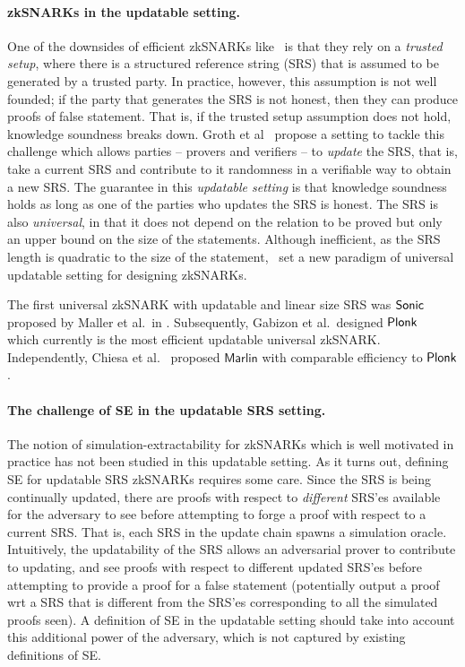 \paragraph{zkSNARKs in the updatable setting.}
One of the downsides of efficient zkSNARKs like~\cite{AC:Groth10a,TCC:Lipmaa12,EC:GGPR13,SP:PHGR13,AC:Lipmaa13,AC:DFGK14,EC:Groth16} is that they rely on a \textit{trusted setup}, where there is a structured reference string (SRS) that is assumed to be generated by a trusted party. In practice, however, this assumption is not well founded; if the party that generates the SRS is not honest, then they can produce proofs of false statement. That is, if the trusted setup assumption does not hold, knowledge soundness breaks down.
Groth et al~\cite{C:GKMMM18} propose a setting to tackle this challenge which allows parties -- provers and verifiers -- to \emph{update} the SRS, that is, take a current SRS and contribute to it randomness in a verifiable way to obtain a new SRS. The guarantee in this \textit{updatable setting} is that knowledge soundness holds as long as one of the parties who updates the SRS is honest. The SRS is also \emph{universal}, in that it does not depend on the relation to be proved but only an upper bound on the size of the statements.
Although inefficient, as the SRS length is quadratic to the size of the statement,~\cite{C:GKMMM18} set a new
paradigm of universal updatable setting for designing zkSNARKs.

The first universal zkSNARK with updatable and linear size SRS was
${\textnormal{\textsf{Sonic}}}$ proposed by Maller et al.~in \cite{CCS:MBKM19}. Subsequently, Gabizon et
al.~designed $\textnormal{\textsf{Plonk}}$~\cite{EPRINT:GabWilCio19} which currently is the
most efficient updatable universal zkSNARK. Independently, Chiesa et
al.~\cite{EC:CHMMVW20} proposed $\textsf{Marlin}$ with comparable efficiency to
$\textnormal{\textsf{Plonk}}$.

\paragraph{The challenge of SE in the updatable SRS setting.}

The notion of simulation-extractability for zkSNARKs which is well motivated in practice has not been studied in this updatable setting. As it turns out, defining SE for updatable SRS zkSNARKs requires some care. Since the SRS is being continually updated, there are proofs with respect to \textit{different} SRS'es available for the adversary to see before attempting to forge a proof with respect to a current SRS. 
That is, each SRS in the update chain spawns a simulation oracle. Intuitively, the updatability of the SRS allows an adversarial prover to contribute to updating, and see proofs with respect to different updated SRS'es before attempting to provide a proof for a false statement (potentially output a proof wrt a SRS that is different from the SRS'es corresponding to all the simulated proofs seen). A definition of SE in the updatable setting should take into account this additional power of the adversary, which is not captured by existing definitions of SE.

